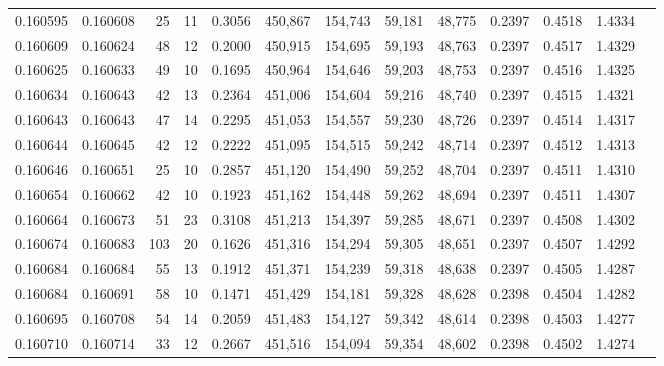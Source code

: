 \begin{tabular}{rrrrrrrrrrrrr}
0.160595 & 0.160608 &    25 &  11 &                                     0.3056 & 450,867 & 154,743 &  59,181 &  48,775 & 0.2397 & 0.4518 & 1.4334 \\
0.160609 & 0.160624 &    48 &  12 &                                     0.2000 & 450,915 & 154,695 &  59,193 &  48,763 & 0.2397 & 0.4517 & 1.4329 \\
0.160625 & 0.160633 &    49 &  10 &                                     0.1695 & 450,964 & 154,646 &  59,203 &  48,753 & 0.2397 & 0.4516 & 1.4325 \\
0.160634 & 0.160643 &    42 &  13 &                                     0.2364 & 451,006 & 154,604 &  59,216 &  48,740 & 0.2397 & 0.4515 & 1.4321 \\
0.160643 & 0.160643 &    47 &  14 &                                     0.2295 & 451,053 & 154,557 &  59,230 &  48,726 & 0.2397 & 0.4514 & 1.4317 \\
0.160644 & 0.160645 &    42 &  12 &                                     0.2222 & 451,095 & 154,515 &  59,242 &  48,714 & 0.2397 & 0.4512 & 1.4313 \\
0.160646 & 0.160651 &    25 &  10 &                                     0.2857 & 451,120 & 154,490 &  59,252 &  48,704 & 0.2397 & 0.4511 & 1.4310 \\
0.160654 & 0.160662 &    42 &  10 &                                     0.1923 & 451,162 & 154,448 &  59,262 &  48,694 & 0.2397 & 0.4511 & 1.4307 \\
0.160664 & 0.160673 &    51 &  23 &                                     0.3108 & 451,213 & 154,397 &  59,285 &  48,671 & 0.2397 & 0.4508 & 1.4302 \\
0.160674 & 0.160683 &   103 &  20 &                                     0.1626 & 451,316 & 154,294 &  59,305 &  48,651 & 0.2397 & 0.4507 & 1.4292 \\
0.160684 & 0.160684 &    55 &  13 &                                     0.1912 & 451,371 & 154,239 &  59,318 &  48,638 & 0.2397 & 0.4505 & 1.4287 \\
0.160684 & 0.160691 &    58 &  10 &                                     0.1471 & 451,429 & 154,181 &  59,328 &  48,628 & 0.2398 & 0.4504 & 1.4282 \\
0.160695 & 0.160708 &    54 &  14 &                                     0.2059 & 451,483 & 154,127 &  59,342 &  48,614 & 0.2398 & 0.4503 & 1.4277 \\
0.160710 & 0.160714 &    33 &  12 &                                     0.2667 & 451,516 & 154,094 &  59,354 &  48,602 & 0.2398 & 0.4502 & 1.4274 \\

\end{tabular}
